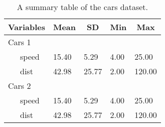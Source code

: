 \documentclass[
  english,
  man, fleqn, noextraspace]{apa6}
\begin{document}
\begin{table}[tbp]

\begin{center}
\begin{threeparttable}

\caption{\label{tab:unnamed-chunk-3}A summary table of the cars dataset.}

\begin{tabular}{lllll}
\toprule
Variables & \multicolumn{1}{c}{Mean} & \multicolumn{1}{c}{SD} & \multicolumn{1}{c}{Min} & \multicolumn{1}{c}{Max}\\
\midrule
Cars 1 &  &  &  & \\
\ \ \ speed & 15.40 & 5.29 & 4.00 & 25.00\\
\ \ \ dist & 42.98 & 25.77 & 2.00 & 120.00\\
Cars 2 &  &  &  & \\
\ \ \ speed & 15.40 & 5.29 & 4.00 & 25.00\\
\ \ \ dist & 42.98 & 25.77 & 2.00 & 120.00\\
\bottomrule
\end{tabular}

\end{threeparttable}
\end{center}

\end{table}
\end{document}

